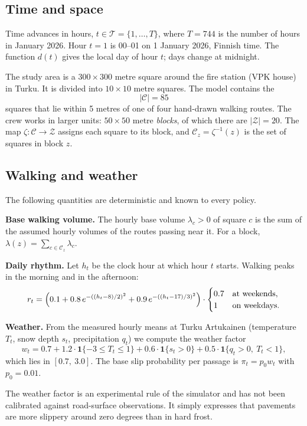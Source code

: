 \documentclass[11pt,a4paper]{article}
\theoremstyle{plain}
\theoremstyle{definition}
\theoremstyle{remark}
\newcommand{\cC}{\mathcal{C}}
\newcommand{\cZ}{\mathcal{Z}}
\newcommand{\cT}{\mathcal{T}}
\newcommand{\1}{\mathbf{1}}
\begin{document}
\subsection{Time and space}

Time advances in hours, $t \in \cT = \{1, \dots, T\}$, where $T = 744$ is the
number of hours in January 2026. Hour $t = 1$ is 00--01 on 1 January 2026,
Finnish time. The function $d(t)$ gives the local day of hour $t$; days change at
midnight.

The study area is a $300 \times 300$ metre square around the fire station (VPK
house) in Turku. It is divided into $10 \times 10$ metre squares. The model
contains the
\[
  |\cC| = 85
\]
squares that lie within 5 metres of one of four hand-drawn walking routes. The
crew works in larger units: $50 \times 50$ metre \emph{blocks}, of which there
are $|\cZ| = 20$. The map $\zeta\colon \cC \to \cZ$ assigns each square to its
block, and $\cC_z = \zeta^{-1}(z)$ is the set of squares in block $z$.

\subsection{Walking and weather}

The following quantities are deterministic and known to every policy.

\textbf{Base walking volume.} The hourly base volume $\lambda_c > 0$ of square
$c$ is the sum of the assumed hourly volumes of the routes passing near it. For a
block, $\lambda(z) = \sum_{c \in \cC_z} \lambda_c$.

\textbf{Daily rhythm.} Let $h_t$ be the clock hour at which hour $t$ starts.
Walking peaks in the morning and in the afternoon:
\[
  r_t = \Bigl(0.1 + 0.8\, e^{-((h_t - 8)/2)^2} + 0.9\, e^{-((h_t - 17)/3)^2}\Bigr)
  \cdot
  \begin{cases} 0.7 & \text{at weekends},\\ 1 & \text{on weekdays}. \end{cases}
\]

\textbf{Weather.} From the measured hourly means at Turku Artukainen (temperature
$T_t$, snow depth $s_t$, precipitation $q_t$) we compute the weather factor
\[
  w_t = 0.7 + 1.2 \cdot \1\{-3 \le T_t \le 1\} + 0.6 \cdot \1\{s_t > 0\}
        + 0.5 \cdot \1\{q_t > 0,\ T_t < 1\},
\]
which lies in $[0.7,\ 3.0]$. The base slip probability per passage is
$\pi_t = p_0 w_t$ with $p_0 = 0.01$.

The weather factor is an experimental rule of the simulator and has not been
calibrated against road-surface observations. It simply expresses that
pavements are more slippery around zero degrees than in hard frost.
\end{document}
